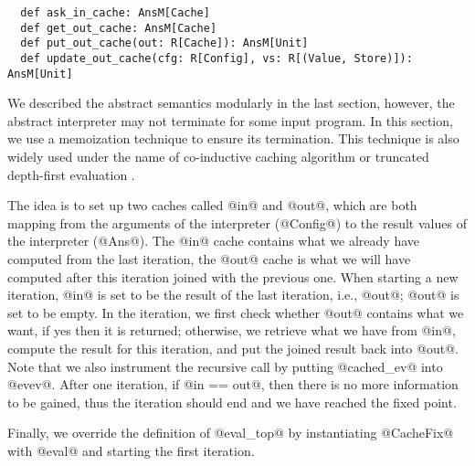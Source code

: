 \begin{lstlisting}
  def ask_in_cache: AnsM[Cache]
  def get_out_cache: AnsM[Cache]
  def put_out_cache(out: R[Cache]): AnsM[Unit]
  def update_out_cache(cfg: R[Config], vs: R[(Value, Store)]): AnsM[Unit]
\end{lstlisting}

We described the abstract semantics modularly in the last section, however, the
abstract interpreter may not terminate for some input program. In this section,
we use a memoization technique to ensure its termination. This technique is also
widely used under the name of co-inductive caching algorithm
\cite{DBLP:journals/pacmpl/DaraisLNH17, Wei:2018:RAA:3243631.3236800} or
truncated depth-first evaluation \cite{Rosendahl:AbsIntPL}.

The idea is to set up two caches called @in@ and @out@, which are both mapping
from the arguments of the interpreter (@Config@) to the result values of the
interpreter (@Ans@). The @in@ cache contains what we already have computed from
the last iteration, the @out@ cache is what we will have computed after this
iteration joined with the previous one. When starting a new iteration, @in@ is
set to be the result of the last iteration, i.e., @out@; @out@ is set to be
empty. In the iteration, we first check whether @out@ contains what we want, if
yes then it is returned; otherwise, we retrieve what we have from @in@, compute
the result for this iteration, and put the joined result back into @out@. Note
that we also instrument the recursive call by putting @cached_ev@ into @evev@.
After one iteration, if @in == out@, then there is no more information to be
gained, thus the iteration should end and we have reached the fixed point.

Finally, we override the definition of @eval_top@ by instantiating @CacheFix@
with @eval@ and starting the first iteration.

